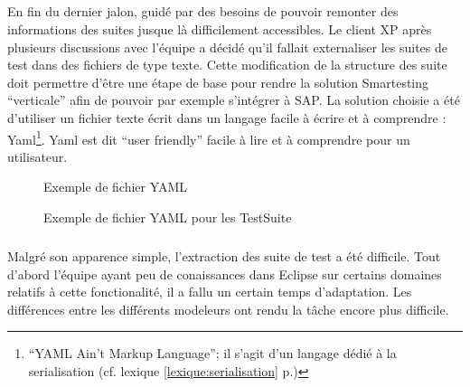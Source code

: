 \subparagraph*{}
En fin du dernier jalon, guidé par des besoins de pouvoir remonter des informations des suites jusque là difficilement accessibles. Le client XP après plusieurs discussions avec l'équipe a décidé qu'il fallait externaliser les suites de test dans des fichiers de type texte. Cette modification de la structure des suite doit permettre d'être une étape de base pour rendre la solution Smartesting ``verticale'' afin de pouvoir par exemple s'intégrer à SAP. La solution choisie a été d'utiliser un fichier texte écrit dans un langage facile à écrire et à comprendre : Yaml\footnote{``YAML Ain't Markup Language''; il s'agit d'un langage dédié à la serialisation (cf. lexique \ref{lexique:serialisation} p.\pageref{lexique:serialisation})}. Yaml est dit ``user friendly'' facile à lire et à comprendre pour un utilisateur.

\begin{figure}[!ht]
\centering
{}
\caption{Exemple de fichier YAML}
\label{figure:exYaml}
\end{figure}

\begin{figure}[!ht]
\centering
{}
\caption{Exemple de fichier YAML pour les TestSuite}
\label{figure:exTestSuite}
\end{figure}

\subparagraph*{}
Malgré son apparence simple, l'extraction des suite de test a été difficile. Tout d'abord l'équipe ayant peu de conaissances dans Eclipse sur certains domaines relatifs à cette fonctionalité, il a fallu un certain temps d'adaptation. Les différences entre les différents modeleurs ont rendu la tâche encore plus difficile.




